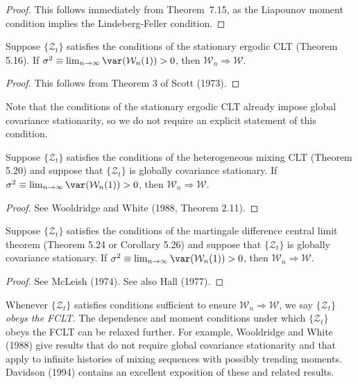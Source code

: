 \begin{proof}
This follows immediately from Theorem~7.15, as the Liapounov moment condition implies the Lindeberg-Feller condition.
\end{proof}

\begin{theorem}\label{thm:stat-ergodic-fclt}
Suppose $\{\mathcal{Z}_t\}$ satisfies the conditions of the stationary ergodic CLT (Theorem 5.16). If $\sigma^2 \equiv \lim_{n\to\infty} \var(\mathcal{W}_n(1)) > 0$, then $\mathcal{W}_n \Rightarrow \mathcal{W}$.
\end{theorem}

\begin{proof}
This follows from Theorem 3 of Scott (1973).
\end{proof}

Note that the conditions of the stationary ergodic CLT already impose global covariance stationarity, so we do not require an explicit statement of this condition.

\begin{theorem}\label{thm:het-mixing-fclt}
Suppose $\{\mathcal{Z}_t\}$ satisfies the conditions of the heterogeneous mixing CLT (Theorem 5.20) and suppose that $\{\mathcal{Z}_t\}$ is globally covariance stationary. If $\sigma^2 \equiv \lim_{n\to\infty} \var(\mathcal{W}_n(1)) > 0$, then $\mathcal{W}_n \Rightarrow \mathcal{W}$.
\end{theorem}

\begin{proof}
See Wooldridge and White (1988, Theorem 2.11).
\end{proof}

\begin{theorem}\label{thm:md-fclt}
Suppose $\{\mathcal{Z}_t\}$ satisfies the conditions of the martingale difference central limit theorem (Theorem 5.24 or Corollary 5.26) and suppose that $\{\mathcal{Z}_t\}$ is globally covariance stationary. If $\sigma^2 \equiv \lim_{n\to\infty} \var(\mathcal{W}_n(1)) > 0$, then $\mathcal{W}_n \Rightarrow \mathcal{W}$.
\end{theorem}

\begin{proof}
See McLeish (1974). See also Hall (1977).
\end{proof}

Whenever $\{\mathcal{Z}_t\}$ satisfies conditions sufficient to ensure $\mathcal{W}_n \Rightarrow \mathcal{W}$, we say $\{\mathcal{Z}_t\}$ \emph{obeys the FCLT}. The dependence and moment conditions under which $\{\mathcal{Z}_t\}$ obeys the FCLT can be relaxed further. For example, Wooldridge and White (1988) give results that do not require global covariance stationarity and that apply to infinite histories of mixing sequences with possibly trending moments. Davidson (1994) contains an excellent exposition of these and related results.

